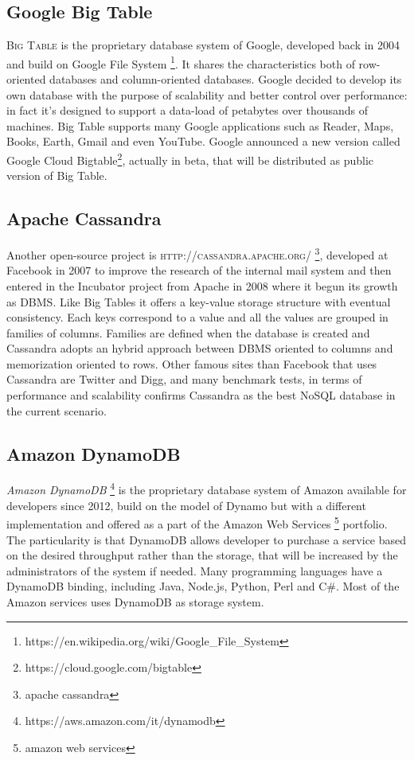 \subsection{Google Big Table}
\textsc{Big Table} is the proprietary database system of Google, developed back in 2004 and build on Google File System \footnote{https://en.wikipedia.org/wiki/Google\_File\_System}. It shares the characteristics both of row-oriented databases and column-oriented databases. Google decided to develop its own database with the purpose of scalability and better control over performance: in fact it’s designed to support a data-load of petabytes over thousands of machines.
Big Table supports many Google applications such as Reader, Maps, Books, Earth, Gmail and even YouTube.
Google announced a new version called Google Cloud Bigtable\footnote{https://cloud.google.com/bigtable}, actually in beta, that will be distributed as public version of Big Table.

\subsection{Apache Cassandra}
Another open-source project is \textsc{http://cassandra.apache.org/} \footnote{apache cassandra}, developed at Facebook in 2007 to improve the research of the internal mail system and then entered in the Incubator project from Apache in 2008 where it begun its growth as DBMS.
Like Big Tables it offers a key-value storage structure with eventual consistency. Each keys correspond to a value and all the values are grouped in families of columns. Families are defined when the database is created and Cassandra adopts an hybrid approach between DBMS oriented to columns and memorization oriented to rows.
Other famous sites than Facebook that uses Cassandra are Twitter and Digg, and many benchmark tests, in terms of performance and scalability confirms Cassandra as the best NoSQL database in the current scenario.

\subsection{Amazon DynamoDB}
\textit{Amazon DynamoDB} \footnote{https://aws.amazon.com/it/dynamodb} is the proprietary database system of Amazon available for developers since 2012, build on the model of Dynamo but with a different implementation and offered as a part of the Amazon Web Services \footnote{amazon web services} portfolio. The particularity is that DynamoDB allows developer to purchase a service based on the desired throughput rather than the storage, that will be increased by the administrators of the system if needed.
Many programming languages have a DynamoDB binding, including Java, Node.js, Python, Perl and C\#.
Most of the Amazon services uses DynamoDB as storage system.


